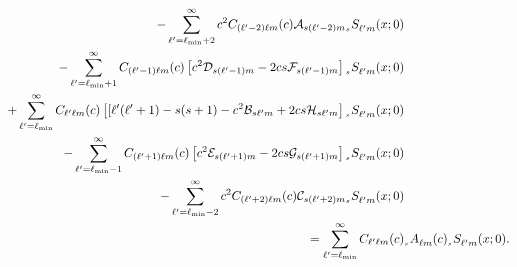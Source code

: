 \documentclass[11pt]{article}
\newcommand{\swS}[5][]{{}_{{}_{#2}}S^{#1}_{#3}(#4;#5)}
\newcommand{\scA}[4][]{{}_{{}_{#2}}A^{#1}_{#3}(#4)}
\begin{document}
\begin{align}
- \sum_{\ell^\prime=\ell_{\mbox{\tiny min}}+2}^\infty c^2 C_{(\ell^\prime-2)\ell{m}}(c)
   \mathcal{A}_{s(\ell^\prime-2)m}\swS{s}{\ell^\prime{m}}{x}{0} &
\nonumber \\
-  \sum_{\ell^\prime=\ell_{\mbox{\tiny min}}+1}^\infty C_{(\ell^\prime-1)\ell{m}}(c)
   \left[c^2\mathcal{D}_{s(\ell^\prime-1)m} 
     - 2cs\mathcal{F}_{s(\ell^\prime-1)m}\right]
   \swS{s}{\ell^\prime{m}}{x}{0} &
\nonumber \\
+  \sum_{\ell^\prime=\ell_{\mbox{\tiny min}}}^\infty C_{\ell^\prime\ell{m}}(c)
   \left[[\ell^\prime(\ell^\prime+1) -s(s+1) 
       - c^2 \mathcal{B}_{s\ell^\prime{m}} + 2cs\mathcal{H}_{s\ell^\prime{m}}
       \right]\swS{s}{\ell^\prime{m}}{x}{0} &
\nonumber \\
-  \sum_{\ell^\prime=\ell_{\mbox{\tiny min}}-1}^\infty C_{(\ell^\prime+1)\ell{m}}(c)
   \left[c^2\mathcal{E}_{s(\ell^\prime+1)m} 
     - 2cs\mathcal{G}_{s(\ell^\prime+1)m}\right]
   \swS{s}{\ell^\prime{m}}{x}{0} &
\nonumber \\
- \sum_{\ell^\prime=\ell_{\mbox{\tiny min}}-2}^\infty c^2 C_{(\ell^\prime+2)\ell{m}}(c)
   \mathcal{C}_{s(\ell^\prime+2)m}\swS{s}{\ell^\prime{m}}{x}{0} &
\nonumber \\
=  \sum_{\ell^\prime=\ell_{\mbox{\tiny min}}}^\infty C_{\ell^\prime\ell{m}}(c)&
   \scA{s}{\ell{m}}{c}\swS{s}{\ell^\prime{m}}{x}{0}.
\end{align}
\end{document}

